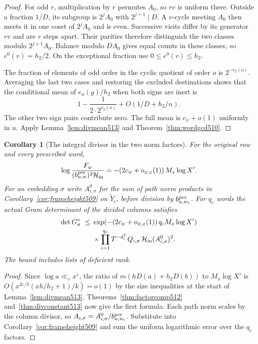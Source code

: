 \documentclass[a4paper,11pt]{article}
\newtheorem{corollary}[proposition]{Corollary}
\theoremstyle{definition}
\theoremstyle{remark}
\numberwithin{equation}{section}
\begin{document}
\begin{proof}
For odd \(r\), multiplication by \(r\) permutes \(A_0\), so
\(rv\) is uniform there. Outside a fraction \(1/D\), its
subgroup is \(2^j A_0\) with \(2^{j+1}\mid D\).
A \(v\)-cycle meeting \(A_0\) then meets it in one coset of
\(2^j A_0\) and is even. Successive visits differ by its
generator \(rv\) and are \(r\) steps apart. Their parities
therefore distinguish the two classes modulo \(2^{j+1}A_0\).
Balance modulo \(D A_0\) gives equal counts in these classes,
so \(e^0(v)=h_2/2\). On the exceptional fraction use
\(0\le e^0(v)\le h_2\).

The fraction of elements of odd order in the cyclic quotient
of order \(o\) is \(2^{-v_2(o)}\). Averaging the last two
cases and restoring the excluded destinations shows that the
conditional mean of \(e_u(g)/h_2\) when both signs are inert is
\[
     1-\frac{1}{2\cdot 2^{v_2(o)}}+O(1/D+h_2/n).
\]
The other two sign pairs contribute zero. The full mean is
\(c_\psi+o(1)\) uniformly in \(u\). Apply
Lemma~\ref{lem:divmean513} and Theorem~\ref{thm:wordgcd510}.
\end{proof}

\begin{corollary}[The integral divisor in the two norm factors]\leavevmode
\label{cor:signedfactor513}
For the original row and every prescribed word,
\[
   \log\frac{F_w}{(b^{\rm per}_{u,w})^2\mathcal H_{\rm in}}
       =-(2c_\psi+o_{\psi,\varepsilon}(1))\,M_x\log X' .
\]
For an embedding \(\sigma\) write \(A^0_{i,\sigma}\) for the
sum of path norm products in Corollary~\ref{cor:frameheight509}
on \(\widetilde Y_i\), before division by \(b^{\rm per}_{u,w_i}\).
For \(q_c\) words the actual Gram determinant of the divided
columns satisfies
\[
 \begin{aligned}
 \det G^\circ_\sigma\ \le{}&
 \exp\!\left(-(2c_\psi+o_{\psi,\varepsilon}(1))\,
                         q_c M_x\log X'\right)\\
 &{}\times\prod_{i=1}^{q_c}
       T^{-d_i^T}Q_{i,\sigma}\,\mathcal H_{\rm in}
                             (A^0_{i,\sigma})^2 .
 \end{aligned}
\]
The bound includes lists of deficient rank.
\end{corollary}
\begin{proof}
Since \(\log a\ll_\varepsilon x^\varepsilon\), the ratio of
\(m(hD(a)+h_2D(b))\) to \(M_x\log X'\) is
\(O(x^{2\varepsilon/3}(x h/h_2+1)/k)=o(1)\) by the size
inequalities at the start of Lemma~\ref{lem:divmean513}.
Theorems~\ref{thm:factorcomp512} and~\ref{thm:divconstant513}
now give the first formula. Each path norm scales by the column
divisor, so \(A_{i,\sigma}=A^0_{i,\sigma}/b^{\rm per}_{u,w_i}\).
Substitute into Corollary~\ref{cor:frameheight509} and sum
the uniform logarithmic error over the \(q_c\) factors.
\end{proof}
\end{document}
